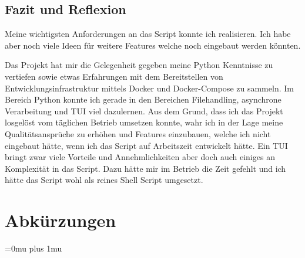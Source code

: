 \documentclass[a4paper,oneside, 12pt]{report}
\begin{document}
\section{Fazit und Reflexion}
Meine wichtigsten Anforderungen an das Script konnte ich realisieren. Ich habe aber noch viele Ideen für weitere Features welche noch eingebaut werden könnten.

Das Projekt hat mir die Gelegenheit gegeben meine Python Kenntnisse zu vertiefen sowie etwas Erfahrungen mit dem Bereitstellen von Entwicklungsinfrastruktur mittels Docker und Docker-Compose zu sammeln. Im Bereich Python konnte ich gerade in den Bereichen Filehandling, asynchrone Verarbeitung und \ac{TUI} viel dazulernen. Aus dem Grund, dass ich das Projekt losgelöst vom täglichen Betrieb umsetzen konnte, wahr ich in der Lage meine Qualitätsansprüche zu erhöhen und Features einzubauen, welche ich nicht eingebaut hätte, wenn ich das Script auf Arbeitszeit entwickelt hätte. Ein \ac{TUI} bringt zwar viele Vorteile und Annehmlichkeiten aber doch auch einiges an Komplexität in das Script. Dazu hätte mir im Betrieb die Zeit gefehlt und ich hätte das Script wohl als reines Shell Script umgesetzt.


\cleardoublepage
{}
{}
\chapter*{Abkürzungen}
\begin{acronym}[Abkürzungen]
\end{acronym}

\cleardoublepage
{}
{}
\Urlmuskip=0mu plus 1mu\relax
\end{document}
